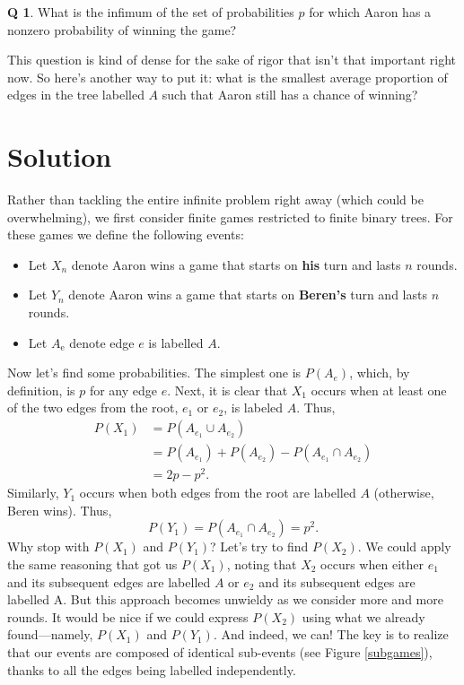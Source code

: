 \documentclass{book}
\theoremstyle{definition}
\theoremstyle{colonstylebf}
\newtheorem*{question*}{Q}
\begin{document}
\begin{question*}\label{infimum}
What is the infimum of the set of probabilities $p$ for which Aaron has a nonzero probability of winning the game?
\end{question*}
This question is kind of dense for the sake of rigor that isn't that important right now. So here's another way to put it: what is the smallest average proportion of edges in the tree labelled $A$ such that Aaron still has a chance of winning?

\chapter{Solution}\label{solution}
Rather than tackling the entire infinite problem right away (which could be overwhelming), we first consider finite games restricted to finite binary trees. For these games we define the following events:
\begin{itemize}
\item Let $X_n$ denote Aaron wins a game that starts on \textbf{his} turn and lasts $n$ rounds.
\item Let $Y_n$ denote Aaron wins a game that starts on \textbf{Beren's} turn and lasts $n$ rounds.
\item Let $A_{\text{e}}$ denote edge $e$ is labelled $A$.
\end{itemize}
Now let's find some probabilities. The simplest one is $P(A_{e})$, which, by definition, is $p$ for any edge $e$. Next, it is clear that $X_1$ occurs when at least one of the two edges from the root, $e_1$ or $e_2$, is labeled $A$. Thus,
\begin{align*}
P(X_1) &= P(A_{e_1} \cup A_{e_2})\\
&= P(A_{e_1}) + P(A_{e_2})- P(A_{e_1} \cap A_{e_2})\\
&= 2p - p^2.
\end{align*}
Similarly, $Y_1$ occurs when both edges from the root are labelled $A$ (otherwise, Beren wins). Thus,
\[P(Y_1) = P(A_{e_1} \cap A_{e_2}) = p^2.\]
Why stop with $P(X_1)$ and $P(Y_1)$? Let's try to find $P(X_2)$. We could apply the same reasoning that got us $P(X_1)$, noting that $X_2$ occurs when either $e_1$ and its subsequent edges are labelled $A$ or $e_2$ and its subsequent edges are labelled A. But this approach becomes unwieldy as we consider more and more rounds. It would be nice if we could express $P(X_2)$ using what we already found---namely, $P(X_1)$ and $P(Y_1)$. And indeed, we can! The key is to realize that our events are composed of identical sub-events (see Figure \ref{subgames}), thanks to all the edges being labelled independently.
\end{document}
